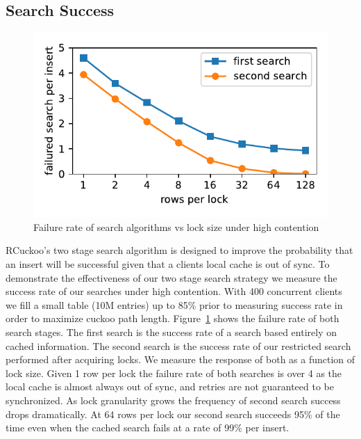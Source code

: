\subsection{Search Success}
\begin{figure}[ht]
    \includegraphics[width=0.99\linewidth]{fig/search_success_lock_size.pdf}
    \caption{Failure rate of search algorithms vs lock size under high contention}
    \label{fig:search_success}
\end{figure}

RCuckoo's two stage search algorithm is designed to improve
the probability that an insert will be successful given that
a clients local cache is out of sync. To demonstrate the
effectiveness of our two stage search strategy we measure
the success rate of our searches under high contention. With
400 concurrent clients we fill a small table (10M entries)
up to 85\% prior to measuring success rate in order to
maximize cuckoo path length. Figure~\ref{fig:search_success}
shows the failure rate of both search stages. The first
search is the success rate of a search based entirely on
cached information. The second search is the success rate of
our restricted search performed after acquiring locks. We
measure the response of both as a function of lock size.
Given 1 row per lock the failure rate of both searches is
over 4 as the local cache is almost always out of sync, and
retries are not guaranteed to be synchronized. As lock
granularity grows the frequency of second search success
drops dramatically. At 64 rows per lock our second search
succeeds 95\% of the time even when the cached search fails
at a rate of 99\% per insert.



